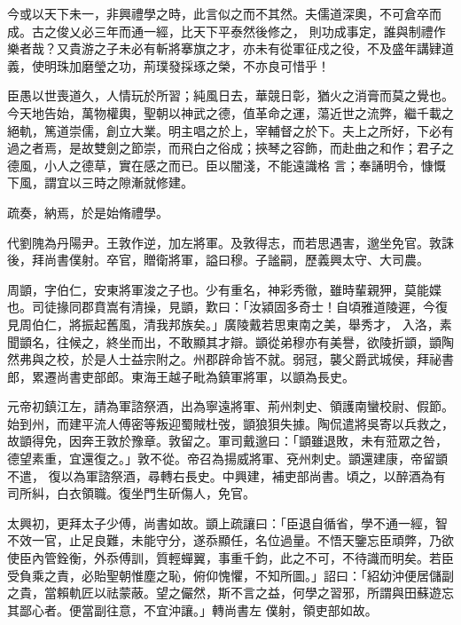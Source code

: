 \begin{pinyinscope}
 今或以天下未一，非興禮學之時，此言似之而不其然。夫儒道深奧，不可倉卒而成。古之俊乂必三年而通一經，比天下平泰然後修之，
 則功成事定，誰與制禮作樂者哉？又貴游之子未必有斬將搴旗之才，亦未有從軍征戍之役，不及盛年講肄道義，使明珠加磨瑩之功，荊璞發採琢之榮，不亦良可惜乎！



 臣愚以世喪道久，人情玩於所習；純風日去，華競日彰，猶火之消膏而莫之覺也。今天地告始，萬物權輿，聖朝以神武之德，值革命之運，蕩近世之流弊，繼千載之絕軌，篤道崇儒，創立大業。明主唱之於上，宰輔督之於下。夫上之所好，下必有過之者焉，是故雙劍之節崇，而飛白之俗成；挾琴之容飾，而赴曲之和作；君子之德風，小人之德草，實在感之而已。臣以闇淺，不能遠識格
 言；奉誦明令，慷慨下風，謂宜以三時之隙漸就修建。



 疏奏，納焉，於是始脩禮學。



 代劉隗為丹陽尹。王敦作逆，加左將軍。及敦得志，而若思遇害，邈坐免官。敦誅後，拜尚書僕射。卒官，贈衛將軍，謚曰穆。子謐嗣，歷義興太守、大司農。



 周顗，字伯仁，安東將軍浚之子也。少有重名，神彩秀徹，雖時輩親狎，莫能媟也。司徒掾同郡賁嵩有清操，見顗，歎曰：「汝潁固多奇士！自頃雅道陵遲，今復見周伯仁，將振起舊風，清我邦族矣。」廣陵戴若思東南之美，舉秀才，
 入洛，素聞顗名，往候之，終坐而出，不敢顯其才辯。顗從弟穆亦有美譽，欲陵折顗，顗陶然弗與之校，於是人士益宗附之。州郡辟命皆不就。弱冠，襲父爵武城侯，拜祕書郎，累遷尚書吏部郎。東海王越子毗為鎮軍將軍，以顗為長史。



 元帝初鎮江左，請為軍諮祭酒，出為寧遠將軍、荊州刺史、領護南蠻校尉、假節。始到州，而建平流人傅密等叛迎蜀賊杜弢，顗狼狽失據。陶侃遣將吳寄以兵救之，故顗得免，因奔王敦於豫章。敦留之。軍司戴邈曰：「顗雖退敗，未有蒞眾之咎，德望素重，宜還復之。」敦不從。帝召為揚威將軍、兗州刺史。顗還建康，帝留顗不遣，
 復以為軍諮祭酒，尋轉右長史。中興建，補吏部尚書。頃之，以醉酒為有司所糾，白衣領職。復坐門生斫傷人，免官。



 太興初，更拜太子少傅，尚書如故。顗上疏讓曰：「臣退自循省，學不通一經，智不效一官，止足良難，未能守分，遂忝顯任，名位過量。不悟天鑒忘臣頑弊，乃欲使臣內管銓衡，外忝傅訓，質輕蟬翼，事重千鈞，此之不可，不待識而明矣。若臣受負乘之責，必貽聖朝惟塵之恥，俯仰愧懼，不知所圖。」詔曰：「紹幼沖便居儲副之貴，當賴軌匠以祛蒙蔽。望之儼然，斯不言之益，何學之習邪，所謂與田蘇遊忘其鄙心者。便當副往意，不宜沖讓。」轉尚書左
 僕射，領吏部如故。




\end{pinyinscope}
